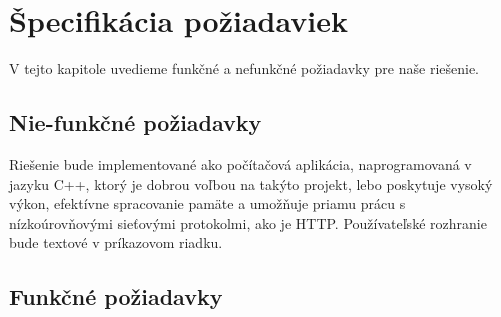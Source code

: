\documentclass[12pt, twoside]{book}
\begin{document}
\section{Špecifikácia požiadaviek}
V tejto kapitole uvedieme funkčné a nefunkčné požiadavky pre naše riešenie.

\subsection{Nie-funkčné požiadavky}
Riešenie bude implementované ako počítačová aplikácia, naprogramovaná v jazyku C++, ktorý je dobrou voľbou na takýto projekt, lebo poskytuje vysoký výkon, efektívne spracovanie pamäte a umožňuje priamu prácu s nízkoúrovňovými sieťovými protokolmi, ako je HTTP.
Používateľské rozhranie bude textové v príkazovom riadku.

\subsection{Funkčné požiadavky}
\end{document}
